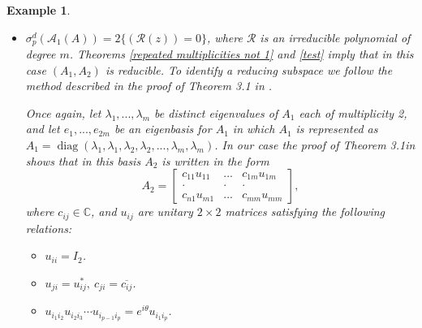 \documentclass[draft, 12pt, reqno]{amsart}
\newcommand{\C}{{\mathbb C}}
\numberwithin{equation}{section}
\DeclareMathOperator{\diag}{diag}
\theoremstyle{plain}
\newtheorem{example}[theorem]{Example}
\begin{document}
\begin{example}
\begin{itemize}

\item[3)] $\sigma_p^d(\mathcal{A}_1(A))=2\big\{ (\mathcal{R}(z))=0\big\} $, where $\mathcal{R}$ is an irreducible polynomial of degree $m$. Theorems \ref{repeated multiplicities not 1} and \ref{test} imply that in this case $(A_1,A_2)$ is reducible. To identify a reducing subspace we follow the method described in the proof of Theorem 3.1 in \cite{S2}.


Once again, let $\lambda_1,...,\lambda_m$ be distinct eigenvalues of $A_1$ each of multiplicity 2, and let $e_1,...,e_{2m}$ be an eigenbasis for $A_1$ in which $A_1$ is represented as $A_1=\diag(\lambda_1,\lambda_1,\lambda_2,\lambda_2,...,\lambda_m,\lambda_m)$. In our case the proof of Theorem 3.1in \cite{S2} shows that in this basis $A_2$ is written in the form
$$ A_2=\left [\begin{array}{ccc} c_{11}u_{11} & ...& c_{1m}u_{1m}\\ \cdot & \cdot & \cdot \\ c_{n1}u_{m1} & ... &c_{mm}u_{mm}  \end{array}  \right ],$$
where $c_{ij}\in \C$, and $u_{ij}$ are unitary $2\times 2$ matrices satisfying the following relations:

\begin{itemize}
\item[1.] $u_{ii}=I_2$.
\item[2.] $u_{ji}=u_{ij}^*, \ c_{ji}=\overline{c_{ij}} $.
\item[3.] $u_{i_1 i_2}u_{i_2i_3}\cdots u_{i_{p-1} i_p}=e^{i\theta}u_{i_1 i_p}$. 
\end{itemize}


\end{itemize}
\end{example}
\end{document}
